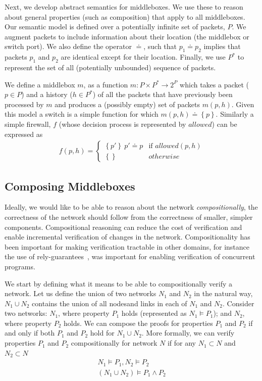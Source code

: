 Next, we develop abstract semantics for middleboxes. We use these to reason about general properties (such as composition) that apply to all middleboxes. Our
semantic model is defined over a potentially infinite set of packets, $P$.  We augment packets to include information about their location (\ie the middlebox or
switch port). We also define the operator $\doteq$, such that $p_1 \doteq p_2$ implies that packets $p_1$ and $p_2$ are identical except for their location. 
Finally, we use $P^*$ to represent the set of all (potentially unbounded) sequence of packets.

We define a middlebox $m$, as a function $m\colon P\times P^* \to 2^P$ which takes a packet ($p\in P$) and a history ($h\in P^*$) of all the packets that have 
previously been processed by $m$ and produces a (possibly empty) set of packets $m(p, h)$. Given this model a switch is a simple function for which 
$m(p, h) \doteq \left\{p\right\}$. Similarly a simple firewall, $f$ (whose decision process is represented by $allowed$) can be expressed as
\begin{align*}
 f(p, h) = \begin{cases}
    \left\{p'\right\}\ p' \doteq p & \mbox{if } allowed(p, h)\\
    \left\{\right\} & otherwise
 \end{cases}
\end{align*}

\subsection{Composing Middleboxes}
Ideally, we would like to be able to reason about the network \emph{compositionally}, \ie the correctness of the network should follow from
the correctness of smaller, simpler components. Compositional reasoning can reduce the cost of verification and enable incremental verification 
of changes in the network. Compositionality has been important for making verification tractable in other domains, for instance the use of
rely-guarantees~\cite{tse:MisraC81,ifip:Jones83}, was important for enabling verification of concurrent programs.

We start by defining what it means to be able to compositionally verify a network. Let us
define the union of two networks $N_1$ and $N_2$ in the natural way, \ie $N_1\cup N_2$ contains the union of all nodesand links in each of $N_1$ and $N_2$. 
Consider two networks: $N_1$, where property $P_1$ holds (represented as $N_1\models P_1$); and $N_2$, where property $P_2$ holds. We can compose the proofs
for properties $P_1$ and $P_2$ if and only if  both $P_1$ and $P_2$ hold for $N_1 \cup N_2$. More formally, we can verify properties $P_1$ and $P_2$ 
compositionally for network $N$ if for any $N_1 \subset N$ and $N_2\subset N$
\begin{align*}
N_1 \models P_1,  N_2\models P_2\\
\hline
(N_1 \cup N_2) \models P_1\land P_2
\end{align*}

